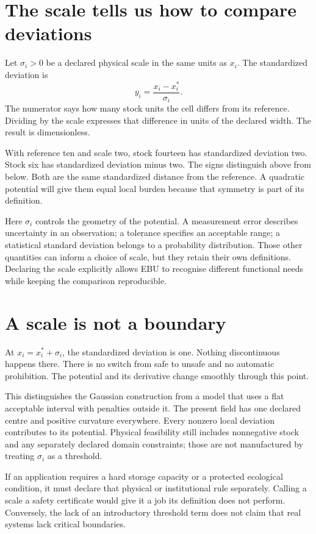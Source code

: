 \section{The scale tells us how to compare deviations}
Let \(\sigma_i>0\) be a declared physical scale in the same units as \(x_i\). The standardized deviation is
\begin{equation}
 y_i=\frac{x_i-x_i^*}{\sigma_i}.
\end{equation}
The numerator says how many stock units the cell differs from its reference. Dividing by the scale expresses that difference in units of the declared width. The result is dimensionless.

With reference ten and scale two, stock fourteen has standardized deviation two. Stock six has standardized deviation minus two. The signs distinguish above from below. Both are the same standardized distance from the reference. A quadratic potential will give them equal local burden because that symmetry is part of its definition.

Here $\sigma_i$ controls the geometry of the potential. A measurement error describes uncertainty in an observation; a tolerance specifies an acceptable range; a statistical standard deviation belongs to a probability distribution. Those other quantities can inform a choice of scale, but they retain their own definitions. Declaring the scale explicitly allows EBU to recognise different functional needs while keeping the comparison reproducible.

\section{A scale is not a boundary}
At \(x_i=x_i^*+\sigma_i\), the standardized deviation is one. Nothing discontinuous happens there. There is no switch from safe to unsafe and no automatic prohibition. The potential and its derivative change smoothly through this point.

This distinguishes the Gaussian construction from a model that uses a flat acceptable interval with penalties outside it. The present field has one declared centre and positive curvature everywhere. Every nonzero local deviation contributes to its potential. Physical feasibility still includes nonnegative stock and any separately declared domain constraints; those are not manufactured by treating \(\sigma_i\) as a threshold.

If an application requires a hard storage capacity or a protected ecological condition, it must declare that physical or institutional rule separately. Calling a scale a safety certificate would give it a job its definition does not perform. Conversely, the lack of an introductory threshold term does not claim that real systems lack critical boundaries.

